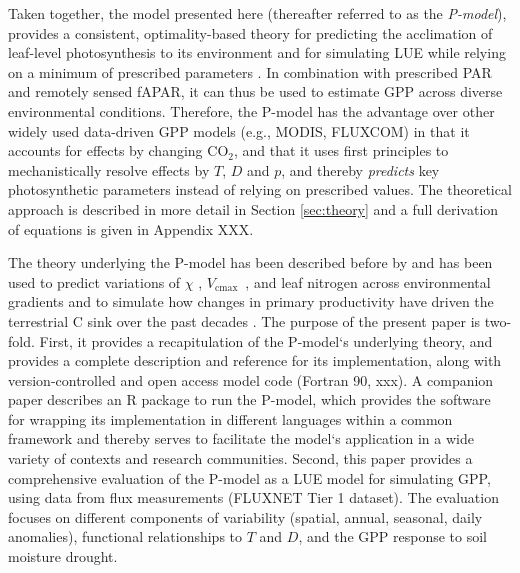 \documentclass{myreport}
\newcommand{\vcmax}{$V_{\text{cmax}}$}
\begin{document}
Taken together, the model presented here (thereafter referred to as the \textit{P-model}), provides a consistent, optimality-based theory for predicting the acclimation of leaf-level photosynthesis to its environment \citep{prentice14ecollett} and for simulating LUE while relying on a minimum of prescribed parameters \citep{wang17natpl}. In combination with prescribed PAR and remotely sensed fAPAR, it can thus be used to estimate GPP across diverse environmental conditions. Therefore, the P-model has the advantage over other widely used data-driven GPP models (e.g., MODIS, FLUXCOM) in that it accounts for effects by changing CO$_2$, and that it uses first principles to mechanistically resolve effects by $T$, $D$ and $p$, and thereby \textit{predicts} key photosynthetic parameters instead of relying on prescribed values. The theoretical approach is described in more detail in Section \ref{sec:theory} and a full derivation of equations is given in Appendix XXX. 

The theory underlying the P-model has been described before by \cite{prentice14ecollett} and has been used to predict variations of $\chi$ \citep{wang17natpl}, \vcmax\ \citep{smith19ecollett}, and leaf nitrogen \citep{dong16bg} across environmental gradients and to simulate how changes in primary productivity have driven the terrestrial C sink over the past decades \citep{keenan17natcomm}. The purpose of the present paper is two-fold. First, it provides a recapitulation of the P-model`s underlying theory, and provides a complete description and reference for its implementation, along with version-controlled and open access model code (Fortran 90, xxx). A companion paper describes an R package to run the P-model, which provides the software for wrapping its implementation in different languages within a common framework and thereby serves to facilitate the model`s application in a wide variety of contexts and research communities. Second, this paper provides a comprehensive evaluation of the P-model as a LUE model for simulating GPP, using data from flux measurements (FLUXNET Tier 1 dataset). The evaluation focuses on different components of variability (spatial, annual, seasonal, daily anomalies), functional relationships to $T$ and $D$, and the GPP response to soil moisture drought.
\end{document}
